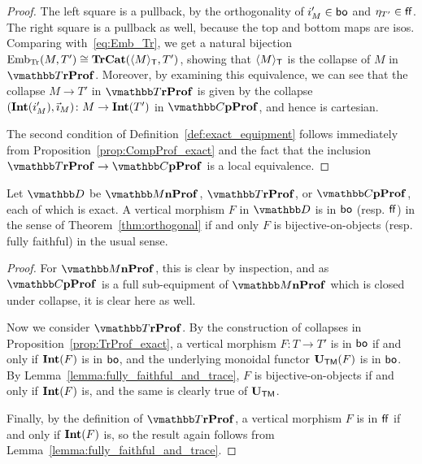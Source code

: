 \documentclass[12pt,oneside,article,draft]{memoir}
\begin{document}
\begin{proof}
   The left square is a pullback, by the orthogonality of $i'_M\in\mathsf{bo}$ and $\eta_{T'}\in\mathsf{ff}$.
   The right square is a pullback as well, because the top and bottom maps are isos. Comparing with~\eqref{eq:Emb_Tr}, we get a natural bijection
   $\mathrm{Emb}_{\mathrm{Tr}}(M,T')\cong\mathbf{TrCat}(\langle M\rangle_{\mathsf{T}},T')$, showing that $\langle M\rangle_{\mathsf{T}}$ is the collapse of
   $M$ in $\dTrProf$. Moreover, by examining this equivalence, we can see that the collapse $M\to
   T'$ in $\dTrProf$ is given by the collapse $(\mathbf{Int}(i'_M),\vec{\imath}_M)\colon M\to\mathbf{Int}(T')$ in
   $\dCompProf$, and hence is cartesian.

   The second condition of Definition~\ref{def:exact_equipment} follows immediately from Proposition~\ref{prop:CompProf_exact} and the fact that the inclusion $\dTrProf\to\dCompProf$ is a local equivalence.
\end{proof}

\begin{proposition}\label{prop:boff_well_named}
   Let $\dcat{D}$ be $\dMonProf$, $\dTrProf$, or $\dCompProf$, each of which is exact. A vertical morphism
   $F$ in $\dcat{D}$ is in $\mathsf{bo}$ (resp. $\mathsf{ff}$) in the sense of Theorem~\ref{thm:orthogonal} if and only
   $F$ is bijective-on-objects (resp. fully faithful) in the usual sense.
\end{proposition}
\begin{proof}
   For $\dMonProf$, this is clear by inspection, and as $\dCompProf$ is a full sub-equipment of
   $\dMonProf$ which is closed under collapse, it is clear here as well.

   Now we consider $\dTrProf$. By the construction of collapses in
   Proposition~\ref{prop:TrProf_exact}, a vertical morphism $F\colon T\to T'$ is in $\mathsf{bo}$ if and
   only if $\mathbf{Int}(F)$ is in $\mathsf{bo}$, and the underlying monoidal functor $\mathbf{U}_{\mathsf{TM}}(F)$ is in $\mathsf{bo}$.
   By Lemma~\ref{lemma:fully_faithful_and_trace}, $F$ is bijective-on-objects if and only if
   $\mathbf{Int}(F)$ is, and the same is clearly true of $\mathbf{U}_{\mathsf{TM}}$.

   Finally, by the definition of $\dTrProf$, a vertical morphism $F$ is in $\mathsf{ff}$ if and only if
   $\mathbf{Int}(F)$ is, so the result again follows from Lemma~\ref{lemma:fully_faithful_and_trace}.
\end{proof}
\end{document}
